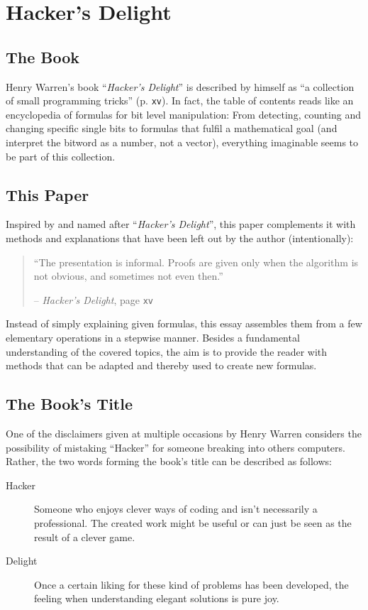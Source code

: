 \section{Hacker's Delight}\label{sec:book}


\subsection*{The Book}
Henry Warren's book ``\emph{Hacker's Delight}''
is described by himself as
``a collection of small programming tricks''
\cite{Warren:2012:HD:2462741} (p. \texttt{xv}).
In fact, the table of contents reads like
an encyclopedia of formulas for bit level manipulation:
From detecting, counting and changing specific single bits
to formulas that fulfil a mathematical goal
(and interpret the bitword as a number, not a vector),
everything imaginable seems to be part of this collection.


\subsection*{This Paper}
Inspired by and named after ``\emph{Hacker's Delight}'',
this paper complements it with methods and explanations
that have been left out by the author (intentionally):

\begin{quote}
``The presentation is informal.
Proofs are given only when the algorithm is not obvious,
and sometimes not even then.''
\par\hfill -- \emph{Hacker's Delight},
page \texttt{xv} \cite{Warren:2012:HD:2462741}
\end{quote}

Instead of simply explaining given formulas,
this essay assembles them from a few elementary operations
in a stepwise manner.
Besides a fundamental understanding of the covered topics,
the aim is to provide the reader with methods
that can be adapted and thereby used to create new formulas.


\subsection*{The Book's Title}
One of the disclaimers given at multiple occasions by Henry Warren
considers the possibility of mistaking ``Hacker''
for someone breaking into others computers.
Rather, the two words forming the book's title
can be described as follows:
\begin{description}
\item[Hacker]
Someone who enjoys clever ways of coding
and isn't necessarily a professional.
The created work might be useful
or can just be seen as the result of a clever game.

\item[Delight]
Once a certain liking for these kind of problems has been developed,
the feeling when understanding elegant solutions is pure joy.
\end{description}
